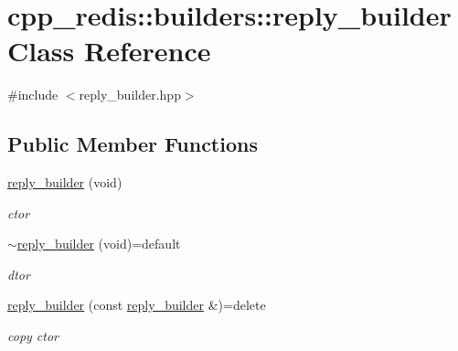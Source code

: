\hypertarget{classcpp__redis_1_1builders_1_1reply__builder}{}\section{cpp\+\_\+redis\+:\+:builders\+:\+:reply\+\_\+builder Class Reference}
\label{classcpp__redis_1_1builders_1_1reply__builder}


{\ttfamily \#include $<$reply\+\_\+builder.\+hpp$>$}

\subsection*{Public Member Functions}
\begin{DoxyCompactItemize}
\item 
\mbox{\label{classcpp__redis_1_1builders_1_1reply__builder_accbe07b853ad26338abf18f7975f616f}} 
\hyperlink{classcpp__redis_1_1builders_1_1reply__builder_accbe07b853ad26338abf18f7975f616f}{reply\+\_\+builder} (void)
\begin{DoxyCompactList}\small\item\em ctor \end{DoxyCompactList}\item 
\mbox{\label{classcpp__redis_1_1builders_1_1reply__builder_ac2df7e1ed2f67e01090ad45926c9af1e}} 
\hyperlink{classcpp__redis_1_1builders_1_1reply__builder_ac2df7e1ed2f67e01090ad45926c9af1e}{$\sim$reply\+\_\+builder} (void)=default
\begin{DoxyCompactList}\small\item\em dtor \end{DoxyCompactList}\item 
\mbox{\label{classcpp__redis_1_1builders_1_1reply__builder_acfffbe0b66c7f9da0f1772b2b7fbdc17}} 
\hyperlink{classcpp__redis_1_1builders_1_1reply__builder_acfffbe0b66c7f9da0f1772b2b7fbdc17}{reply\+\_\+builder} (const \hyperlink{classcpp__redis_1_1builders_1_1reply__builder}{reply\+\_\+builder} \&)=delete
\begin{DoxyCompactList}\small\item\em copy ctor \end{DoxyCompactList}\item 

\end{DoxyCompactItemize}

